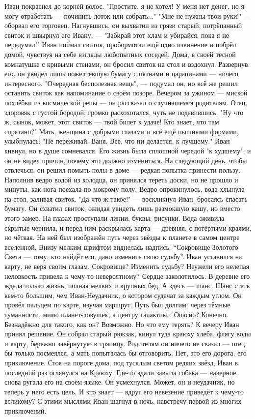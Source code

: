 \documentclass[12pt,a4paper]{book}
\begin{document}
Иван покраснел до корней волос. "Простите, я не хотел! У меня нет денег, но я могу отработать — починить лоток или собрать..."
"Мне не нужны твои руки!" — оборвал его торговец. Нагнувшись, он выхватил из грязи старый, потрёпанный свиток и швырнул его Ивану. — "Забирай этот хлам и убирайся, пока я не передумал!"
Иван поймал свиток, пробормотал ещё одно извинение и побрёл домой, чувствуя на себе взгляды любопытных соседей. Дома, в своей тесной комнатушке с кривыми стенами, он бросил свиток на стол и вздохнул. Развернув его, он увидел лишь пожелтевшую бумагу с пятнами и царапинами — ничего интересного. "Очередная бесполезная вещь", — подумал он, но всё же решил оставить свиток как напоминание о своём позоре.
Вечером за ужином — миской похлёбки из космической репы — он рассказал о случившемся родителям. Отец, здоровяк с густой бородой, громко расхохотался, чуть не подавившись. "Ну что ж, сынок, может, этот свиток — твой билет к удаче! Кто знает, что там спрятано?"
Мать, женщина с добрыми глазами и всё ещё пышными формами, улыбнулась: "Не переживай, Ваня. Всё, что ни делается, к лучшему."
Иван кивнул, но в душе сомневался. Его жизнь была сплошной чередой "к худшему", и он не видел причин, почему это должно измениться.
На следующий день, чтобы отвлечься, он решил помыть полы в доме — редкая попытка принести пользу. Наполнив ведро водой из колодца, он принялся тереть доски, но не прошло и минуты, как нога поехала по мокрому полу. Ведро опрокинулось, вода хлынула на стол, заливая свиток.
"Да что ж такое!" — воскликнул Иван, бросаясь спасать бумагу. Он схватил свиток, ожидая увидеть лишь размокшую кашу, но вместо этого замер. На глазах проступали линии, буквы, рисунки. Вода оживила скрытые чернила, и перед ним раскрылась карта — древняя, с потёртыми краями, но чёткая. На ней был изображён путь через звёзды к планете в самом центре вселенной. Внизу мелким шрифтом виднелась надпись: “Сокровище Золотого Света — тому, кто найдёт его, дано изменить свою судьбу”.
Иван уставился на карту, не веря своим глазам. Сокровище? Изменить судьбу? Неужели его нелепая неловкость привела к чему-то невероятному? Сердце заколотилось. В деревне его ждала только жизнь, полная мелких и крупных бед. А здесь — шанс. Шанс стать кем-то большим, чем Иван-Неудачник, о котором судачат за каждым углом.
Он провёл пальцем по карте, изучая маршрут. Путь был долгим: через тёмные туманности, мимо планет-ловушек, к центру галактики. Опасно? Конечно. Безнадёжно для такого, как он? Возможно. Но что ему терять?
К вечеру Иван принял решение. Он собрал старый рюкзак, кинул туда краюху хлеба, флягу воды и карту, бережно завёрнутую в тряпицу. Родителям он ничего не сказал — отец бы только посмеялся, а мать попыталась бы отговорить. Нет, это его дорога, его приключение.
Стоя на пороге дома, под тусклым светом редких звёзд, Иван в последний раз оглянулся на Краюху. Где-то вдали завыла собака — наверное, снова ругала его на своём языке. Он усмехнулся. Может, он и неудачник, но теперь у него есть цель. И кто знает — вдруг его невезение приведёт к чему-то великому?
С этими мыслями Иван шагнул в ночь, навстречу первой из многих приключений.
\end{document}
